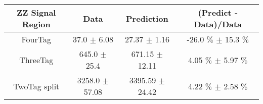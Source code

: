 \begin{footnotesize} 
\begin{tabular}{c|c|c|c} 
ZZ Signal Region & Data & Prediction & (Predict - Data)/Data \\ 
\hline\hline 
FourTag & 37.0 $\pm$ 6.08 & 27.37 $\pm$ 1.16 & -26.0 $\%$  $\pm$ 15.3 $\%$ \\ 
\hline 
ThreeTag & 645.0 $\pm$ 25.4 & 671.15 $\pm$ 12.11 & 4.05 $\%$  $\pm$ 5.97 $\%$ \\ 
\hline 
TwoTag split & 3258.0 $\pm$ 57.08 & 3395.59 $\pm$ 24.42 & 4.22 $\%$  $\pm$ 2.58 $\%$ \\ 
\hline\hline 
\end{tabular} 
\end{footnotesize} 
\newline 
